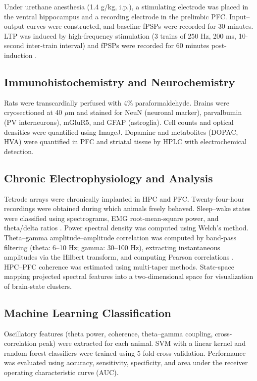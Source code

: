 \documentclass[11pt]{article}
\begin{document}
Under urethane anesthesia (1.4 g/kg, i.p.), a stimulating electrode was placed in the ventral hippocampus and a recording electrode in the prelimbic PFC. Input--output curves were constructed, and baseline fPSPs were recorded for 30 minutes. LTP was induced by high-frequency stimulation (3 trains of 250 Hz, 200 ms, 10-second inter-train interval) and fPSPs were recorded for 60 minutes post-induction \citep{laroche2000hippocampal}.

\subsection{Immunohistochemistry and Neurochemistry}

Rats were transcardially perfused with 4\% paraformaldehyde. Brains were cryosectioned at 40 $\mu$m and stained for NeuN (neuronal marker), parvalbumin (PV interneurons), mGluR5, and GFAP (astroglia). Cell counts and optical densities were quantified using ImageJ. Dopamine and metabolites (DOPAC, HVA) were quantified in PFC and striatal tissue by HPLC with electrochemical detection.

\subsection{Chronic Electrophysiology and Analysis}

Tetrode arrays were chronically implanted in HPC and PFC. Twenty-four-hour recordings were obtained during which animals freely behaved. Sleep--wake states were classified using spectrograms, EMG root-mean-square power, and theta/delta ratios \citep{boyce2016causal}. Power spectral density was computed using Welch's method. Theta--gamma amplitude--amplitude correlation was computed by band-pass filtering (theta: 6--10 Hz; gamma: 30--100 Hz), extracting instantaneous amplitudes via the Hilbert transform, and computing Pearson correlations \citep{adhikari2010cross}. HPC--PFC coherence was estimated using multi-taper methods. State-space mapping projected spectral features into a two-dimensional space for visualization of brain-state clusters.

\subsection{Machine Learning Classification}

Oscillatory features (theta power, coherence, theta--gamma coupling, cross-correlation peak) were extracted for each animal. SVM with a linear kernel and random forest classifiers were trained using 5-fold cross-validation. Performance was evaluated using accuracy, sensitivity, specificity, and area under the receiver operating characteristic curve (AUC).
\end{document}
